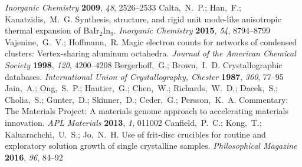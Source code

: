 \documentclass[journal=cmatex,manuscript=article]{achemso}
\begin{document}
\begin{mcitethebibliography}{73}
	\emph{Inorganic Chemistry} \textbf{2009}, \emph{48}, 2526--2533\relax
	\mciteBstWouldAddEndPuncttrue
	\mciteSetBstMidEndSepPunct{\mcitedefaultmidpunct}
	{\mcitedefaultendpunct}{\mcitedefaultseppunct}\relax
	\EndOfBibitem
	Calta,~N.~P.; Han,~F.; Kanatzidis,~M.~G. Synthesis, structure, and rigid unit
	mode-like anisotropic thermal expansion of {BaIr}$_2${In}$_9$.
	\emph{Inorganic Chemistry} \textbf{2015}, \emph{54}, 8794--8799\relax
	\mciteBstWouldAddEndPuncttrue
	\mciteSetBstMidEndSepPunct{\mcitedefaultmidpunct}
	{\mcitedefaultendpunct}{\mcitedefaultseppunct}\relax
	\EndOfBibitem
	Vajenine,~G.~V.; Hoffmann,~R. Magic electron counts for networks of condensed
	clusters: Vertex-sharing aluminum octahedra. \emph{Journal of the American
		Chemical Society} \textbf{1998}, \emph{120}, 4200--4208\relax
	\mciteBstWouldAddEndPuncttrue
	\mciteSetBstMidEndSepPunct{\mcitedefaultmidpunct}
	{\mcitedefaultendpunct}{\mcitedefaultseppunct}\relax
	\EndOfBibitem
	Bergerhoff,~G.; Brown,~I.~D. Crystallographic databases. \emph{International
		Union of Crystallography, Chester} \textbf{1987}, \emph{360}, 77--95\relax
	\mciteBstWouldAddEndPuncttrue
	\mciteSetBstMidEndSepPunct{\mcitedefaultmidpunct}
	{\mcitedefaultendpunct}{\mcitedefaultseppunct}\relax
	\EndOfBibitem
	Jain,~A.; Ong,~S.~P.; Hautier,~G.; Chen,~W.; Richards,~W.~D.; Dacek,~S.;
	Cholia,~S.; Gunter,~D.; Skinner,~D.; Ceder,~G.; Persson,~K.~A. Commentary:
	The {M}aterials {P}roject: A materials genome approach to accelerating
	materials innovation. \emph{{APL} {M}aterials} \textbf{2013}, \emph{1},
	011002\relax
	\mciteBstWouldAddEndPuncttrue
	\mciteSetBstMidEndSepPunct{\mcitedefaultmidpunct}
	{\mcitedefaultendpunct}{\mcitedefaultseppunct}\relax
	\EndOfBibitem
	Canfield,~P.~C.; Kong,~T.; Kaluarachchi,~U.~S.; Jo,~N.~H. Use of frit-disc
	crucibles for routine and exploratory solution growth of single crystalline
	samples. \emph{Philosophical Magazine} \textbf{2016}, \emph{96}, 84--92\relax
	\mciteBstWouldAddEndPuncttrue
	\mciteSetBstMidEndSepPunct{\mcitedefaultmidpunct}
	{\mcitedefaultendpunct}{\mcitedefaultseppunct}\relax

\end{mcitethebibliography}
\end{document}
